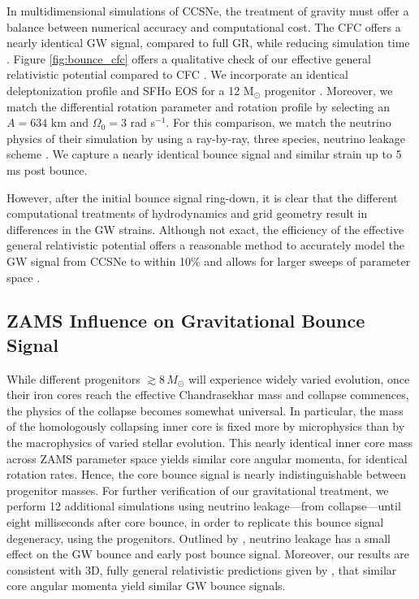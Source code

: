 \documentclass[twocolumn,times]{aastex62}  %
\newcommand{\Msun}{\ensuremath{\mathrm{M}_\odot}\xspace}
\begin{document}
In multidimensional simulations of CCSNe, the treatment of gravity must offer a balance between numerical accuracy and computational cost.   The CFC offers a nearly identical GW signal, compared to full GR, while reducing simulation time \citep{ott:2007}.  Figure \ref{fig:bounce_cfc} offers a qualitative check of our effective general relativistic potential compared to CFC \citep{richers:2017}.  We incorporate an identical deleptonization profile \citep{lieb:2005} and SFHo EOS \citep{steiner:2013} for a 12 \Msun progenitor \citep{woosley:2007}.  Moreover, we match the differential rotation parameter and rotation profile by selecting an $A = 634$ km and $\Omega_0 = 3$ rad s$^{-1}$.  For this comparison, we match the neutrino physics of their simulation by using a ray-by-ray, three species, neutrino leakage scheme \citep{oconnor:2010,couch:2014}.  We capture a nearly identical bounce signal and similar strain up to 5 ms post bounce. \par
However, after the initial bounce signal ring-down, it is clear that the different computational treatments of hydrodynamics and grid geometry result in differences in the GW strains.  Although not exact, the efficiency of the effective general relativistic potential offers a reasonable method to accurately model the GW signal from CCSNe to within 10\% and allows for larger sweeps of parameter space \citep{muller:2013}.



\subsection{ZAMS Influence on Gravitational Bounce Signal}

While different progenitors $\gtrsim$$8\, M_\odot$ will experience widely varied evolution, once their iron cores reach the effective Chandrasekhar mass \citep{baron:1990} and collapse commences, the physics of the collapse becomes somewhat universal.
In particular, the mass of the homologously collapsing inner core is fixed more by microphysics than by the macrophysics of varied stellar evolution. 
This nearly identical inner core mass across ZAMS parameter space yields similar core angular momenta, for identical rotation rates.  Hence, the core bounce signal is nearly indistinguishable between progenitor masses.  For further verification of our gravitational treatment, we perform 12 additional simulations using neutrino leakage---from collapse---until eight milliseconds after core bounce, in order to replicate this bounce signal degeneracy, using the \citet{Suk:2016} progenitors.  Outlined by \citet{ott:2012}, neutrino leakage has a small effect on the GW bounce and early post bounce signal.  
Moreover, our results are consistent with 3D, fully general relativistic predictions given by \citet{ott:2012}, that similar core angular momenta yield similar GW bounce signals.  
\end{document}
